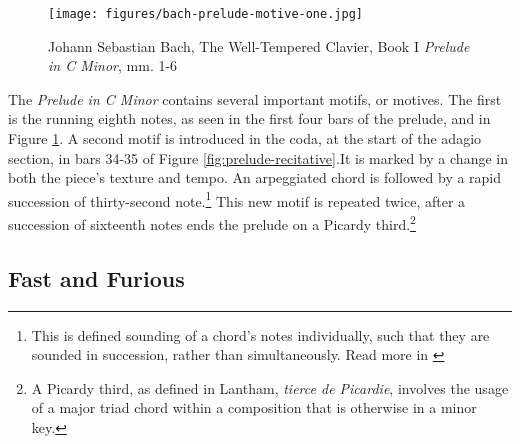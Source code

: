 \begin{figure}
    \centering
    \texttt{[image: figures/bach-prelude-motive-one.jpg]}
    \caption{Johann Sebastian Bach, The Well-Tempered Clavier, Book I \textit{Prelude in C Minor}, mm. 1-6}
    \label{fig:bach-first-motive}
\end{figure}

The \textit{Prelude in C Minor} contains several important motifs, or motives. The first is the running eighth notes, as seen in the first four bars of the prelude, and in Figure \ref{fig:bach-first-motive}\autocite{Henle_2009}. A second motif is introduced in the coda, at the start of the adagio section, in bars 34-35 of Figure \ref{fig:prelude-recitative}\autocite{Henle_2009}.It is marked by a change in both the piece's texture and tempo. An arpeggiated chord is followed by a rapid succession of thirty-second note.\footnote{This is defined sounding of a chord's notes individually, such that they are sounded in succession, rather than simultaneously. Read more in \cite{Arpeggio_2001}} This new motif is repeated twice, after a succession of sixteenth notes ends the prelude on a Picardy third.\footnote{A Picardy third, as defined in Lantham, \textit{tierce de Picardie}, involves the usage of a major triad chord within a composition that is otherwise in a minor key.}

\subsection{Fast and Furious}

